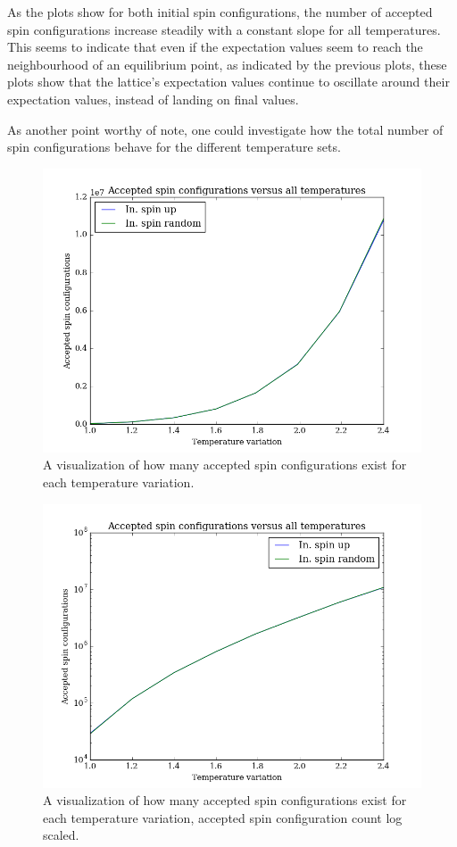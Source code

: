 \documentclass[11pt,a4paper,notitlepage,twocolumn]{article}
\begin{document}
As the plots show for both initial spin configurations, the number of accepted spin configurations increase steadily with a constant slope for all temperatures. This seems to indicate that even if the expectation values seem to reach the neighbourhood of an equilibrium point, as indicated by the previous plots, these plots show that the lattice's expectation values continue to oscillate around their expectation values, instead of landing on final values.

As another point worthy of note, one could investigate how the total number of spin configurations behave for the different temperature sets.
\begin{figure}
[H]\center
\includegraphics[scale=0.35]{../figs/4c/acceptedspins_vsTemps.png}
\caption{A visualization of how many accepted spin configurations exist for each temperature variation.}
\end{figure}
\begin{figure}
[H]\center
\includegraphics[scale=0.35]{../figs/4c/acceptedspins_vsTemps_log.png}
\caption{A visualization of how many accepted spin configurations exist for each temperature variation, accepted spin configuration count log scaled.}
\end{figure}
\end{document}
